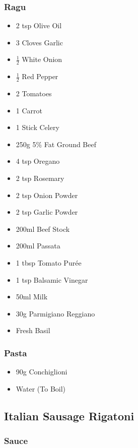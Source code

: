 \documentclass[11pt, english]{article}
\begin{document}
		\subsubsection*{Ragu}

	\begin{itemize}
        \setlength\itemsep{0cm}
		\item 2 tsp Olive Oil
		\item 3 Cloves Garlic
		\item $\frac{1}{2}$ White Onion
		\item $\frac{1}{2}$ Red Pepper
		\item 2 Tomatoes
		\item 1 Carrot
		\item 1 Stick Celery
		\item 250g 5\% Fat Ground Beef
		\item 4 tsp Oregano
		\item 2 tsp Rosemary
		\item 2 tsp Onion Powder
		\item 2 tsp Garlic Powder
		\item 200ml Beef Stock
		\item 200ml Passata
		\item 1 tbsp Tomato Pur\'{e}e
		\item 1 tsp Balsamic Vinegar
		\item 50ml Milk
		\item 30g Parmigiano Reggiano
		\item Fresh Basil
        \end{itemize}

		\subsubsection*{Pasta}

	\begin{itemize}
        \setlength\itemsep{0cm}
                \item 90g Conchiglioni
		\item Water (To Boil)
        \end{itemize}

\newpage

	\subsection{Italian Sausage Rigatoni}

		\subsubsection*{Sauce}
\end{document}
